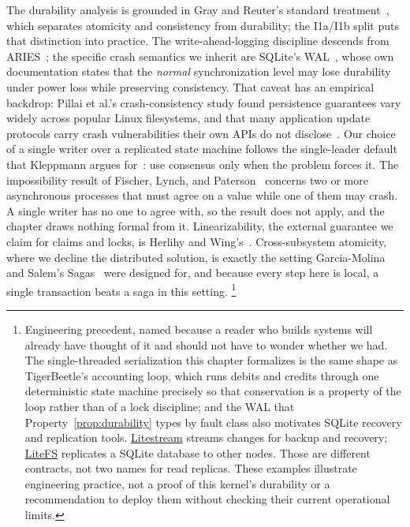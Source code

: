 \documentclass[11pt,a4paper]{article}
\theoremstyle{definition}
\theoremstyle{remark}
\begin{document}
The durability analysis is grounded in Gray and Reuter's standard
treatment~, which separates atomicity and consistency from
durability; the I1a/I1b split puts that distinction into practice. The
write-ahead-logging discipline descends from ARIES~; the
specific crash semantics we inherit are SQLite's WAL~, whose own
documentation states that the \emph{normal} synchronization level may lose
durability under power loss while preserving consistency. That caveat has an
empirical backdrop: Pillai et al.'s crash-consistency study found persistence
guarantees vary widely across popular Linux filesystems, and that many
application update protocols carry crash vulnerabilities their own APIs do not
disclose~. Our choice of a single writer over a
replicated state machine follows the single-leader default that Kleppmann argues
for~: use consensus only when the problem forces it. The
impossibility result of Fischer, Lynch, and Paterson~ concerns two or
more asynchronous processes that must agree on a value while one of them may crash.
A single writer has no one to agree with, so the result does not apply, and the
chapter draws nothing formal from it. Linearizability, the external guarantee we claim for claims and locks, is
Herlihy and Wing's~. Cross-subsystem atomicity, where we decline
the distributed solution, is exactly the setting Garcia-Molina and Salem's
Sagas~ were designed for, and because every step here is
local, a single transaction beats a saga in this setting.%
\footnote{Engineering precedent, named because a reader who builds systems will
already have thought of it and should not have to wonder whether we had. The
single-threaded serialization this chapter formalizes is the same shape as
TigerBeetle's accounting loop, which runs debits and credits through one
deterministic state machine precisely so that conservation is a property of the
loop rather than of a lock discipline; and the WAL that
Property~\ref{prop:durability} types by fault class also motivates SQLite recovery
and replication tools. \href{https://litestream.io/}{Litestream} streams changes
for backup and recovery; \href{https://fly.io/docs/litefs/}{LiteFS} replicates a
SQLite database to other nodes. Those are different contracts, not two names for
read replicas. These examples illustrate engineering practice, not a proof of
this kernel's durability or a recommendation to deploy them without checking
their current operational limits.}
\end{document}
